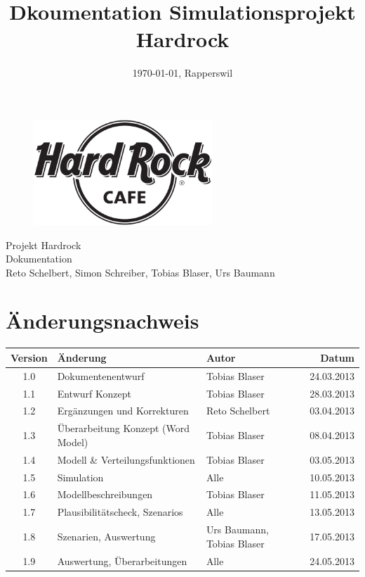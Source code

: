 \documentclass[ngerman,a4paper,12pt]{scrreprt}
\title{Dkoumentation Simulationsprojekt Hardrock}
\date{\today{}, Rapperswil}
\def\author{Reto Schelbert, Simon Schreiber, Tobias Blaser, Urs Baumann}
\begin{document}
\thispagestyle{empty}
\begin{titlepage}
	\begin{center}

	\vspace*{40mm}
	
	\begin{figure}[htp]
		\centering
		\includegraphics[width=0.60\textwidth]{img/Hard-Rock-Cafe-Logo-Black-White.png}
	\end{figure}		
	\vspace*{20mm}
	
	{\fontsize{40}{48} \selectfont Projekt Hardrock \\[10mm]}
	{\fontsize{32}{48} \selectfont Dokumentation \\[5mm]}	
	\vspace*{20mm}
	\author

\end{center}
\end{titlepage}
\clearpage

\chapter*{Änderungsnachweis}
\begin{tabularx}{\textwidth}{|cXlr|} %
		\hline
		\textbf{Version} & \textbf{Änderung} & \textbf{Autor} & \textbf{Datum}\\
		\hline
		1.0 & Dokumentenentwurf & Tobias Blaser & 24.03.2013 \\
		1.1 & Entwurf Konzept & Tobias Blaser & 28.03.2013 \\
		1.2 & Ergänzungen und Korrekturen & Reto Schelbert & 03.04.2013 \\
		1.3 & Überarbeitung Konzept (Word Model) & Tobias Blaser & 08.04.2013 \\
		1.4 & Modell \& Verteilungsfunktionen & Tobias Blaser & 03.05.2013 \\
		1.5 & Simulation & Alle & 10.05.2013 \\
		1.6 & Modellbeschreibungen & Tobias Blaser & 11.05.2013\\
		1.7 & Plausibilitätscheck, Szenarios & Alle & 13.05.2013\\
		1.8 & Szenarien, Auswertung & Urs Baumann, Tobias Blaser & 17.05.2013\\
		1.9 & Auswertung, Überarbeitungen & Alle & 24.05.2013\\
		\hline
\end{tabularx}
\end{document}

